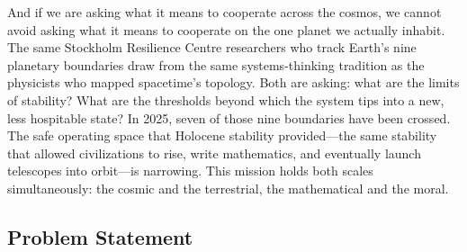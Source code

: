 \documentclass[11pt,letterpaper]{article}
\begin{document}
And if we are asking what it means to cooperate across the cosmos, we cannot avoid asking what it means to cooperate on the one planet we actually inhabit. The same Stockholm Resilience Centre researchers who track Earth's nine planetary boundaries draw from the same systems-thinking tradition as the physicists who mapped spacetime's topology. Both are asking: what are the limits of stability? What are the thresholds beyond which the system tips into a new, less hospitable state? In 2025, seven of those nine boundaries have been crossed. The safe operating space that Holocene stability provided---the same stability that allowed civilizations to rise, write mathematics, and eventually launch telescopes into orbit---is narrowing. This mission holds both scales simultaneously: the cosmic and the terrestrial, the mathematical and the moral.

\subsection{Problem Statement}
\end{document}
